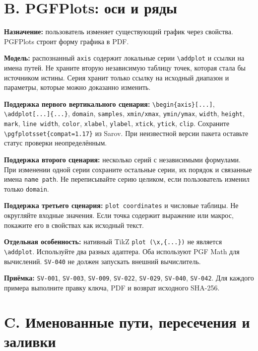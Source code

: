 \documentclass[11pt,a4paper,oneside]{scrreprt}
\begin{document}
\section{B. PGFPlots: оси и ряды}\label{b.-pgfplots-ux43eux441ux438-ux438-ux440ux44fux434ux44b}

\textbf{Назначение:} пользователь изменяет существующий график через свойства. PGFPlots строит форму графика в PDF.

\textbf{Модель:} распознанный \texttt{axis} содержит локальные серии \texttt{\textbackslash{}addplot} и ссылки на имена путей. Не храните вторую независимую таблицу точек, которая стала бы источником истины. Серия хранит только ссылку на исходный диапазон и параметры, которые можно доказанно изменить.

\textbf{Поддержка первого вертикального сценария:} \texttt{\textbackslash{}begin\{axis\}{[}...{]}}, \texttt{\textbackslash{}addplot{[}...{]}\{...\}}, \texttt{domain}, \texttt{samples}, \texttt{xmin/xmax}, \texttt{ymin/ymax}, \texttt{width}, \texttt{height}, \texttt{mark}, \texttt{line\ width}, \texttt{color}, \texttt{xlabel}, \texttt{ylabel}, \texttt{xtick}, \texttt{ytick}, \texttt{clip}. Сохраните \texttt{\textbackslash{}pgfplotsset\{compat=1.17\}} из Sarov. При неизвестной версии пакета оставьте статус проверки неопределённым.

\textbf{Поддержка второго сценария:} несколько серий с независимыми формулами. При изменении одной серии сохраните остальные серии, их порядок и связанные имена \texttt{name\ path}. Не переписывайте серию целиком, если пользователь изменил только \texttt{domain}.

\textbf{Поддержка третьего сценария:} \texttt{plot\ coordinates} и числовые таблицы. Не округляйте входные значения. Если точка содержит выражение или макрос, покажите его в свойствах как исходный текст.

\textbf{Отдельная особенность:} нативный TikZ \texttt{plot\ (\textbackslash{}x,\{...\})} не является \texttt{\textbackslash{}addplot}. Используйте два разных адаптера. Оба используют PGF Math для вычислений. \texttt{SV-040} не должен запускать внешний вычислитель.

\textbf{Приёмка:} \texttt{SV-001}, \texttt{SV-003}, \texttt{SV-009}, \texttt{SV-022}, \texttt{SV-029}, \texttt{SV-040}, \texttt{SV-042}. Для каждого примера выполните правку ключа, PDF и возврат исходного SHA-256.

\section{C. Именованные пути, пересечения и заливки}\label{c.-ux438ux43cux435ux43dux43eux432ux430ux43dux43dux44bux435-ux43fux443ux442ux438-ux43fux435ux440ux435ux441ux435ux447ux435ux43dux438ux44f-ux438-ux437ux430ux43bux438ux432ux43aux438}
\end{document}
